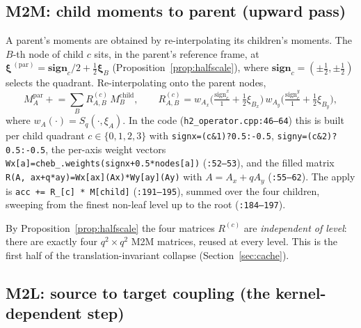 \documentclass[11pt,a4paper]{article}
\newcommand{\code}[1]{\texttt{#1}}
\theoremstyle{definition}
\theoremstyle{remark}
\begin{document}
\subsection{M2M: child moments to parent (upward pass)}
\label{sec:m2m}

A parent's moments are obtained by re-interpolating its children's moments. The
$B$-th node of child $c$ sits, in the parent's reference frame, at
$\boldsymbol\xi^{\,(\text{par})}=\mathbf{sign}_c/2 + \tfrac12\boldsymbol\xi_B$
(Proposition~\ref{prop:halfscale}), where $\mathbf{sign}_c=(\pm\tfrac12,\pm\tfrac12)$
selects the quadrant. Re-interpolating onto the parent nodes,
\begin{equation}
  M^{\text{par}}_A \mathrel{+}= \sum_{B} R^{(c)}_{A,B}\, M^{\text{child}}_B,
  \qquad
  R^{(c)}_{A,B} = w_{A_x}\!\big(\tfrac{\text{sign}^x_c}{1}+\tfrac12\xi_{B_x}\big)\,
                  w_{A_y}\!\big(\tfrac{\text{sign}^y_c}{1}+\tfrac12\xi_{B_y}\big),
  \label{eq:m2m}
\end{equation}
where $w_{A}(\cdot)=S_q(\cdot,\xi_A)$. In the code (\code{h2\_operator.cpp:46--64})
this is built per child quadrant $c\in\{0,1,2,3\}$ with
\code{signx=(c\&1)?0.5:-0.5}, \code{signy=(c\&2)?0.5:-0.5}, the per-axis weight
vectors \code{Wx[a]=cheb\_.weights(signx+0.5*nodes[a])} (\code{:52--53}), and the
filled matrix \code{R(A, ax+q*ay)=Wx[ax](Ax)*Wy[ay](Ay)} with $A=A_x+q A_y$
(\code{:55--62}). The apply is \code{acc += R\_[c] * M[child]}
(\code{:191--195}), summed over the four children, sweeping from the finest
non-leaf level up to the root (\code{:184--197}).

By Proposition~\ref{prop:halfscale} the four matrices $R^{(c)}$ are
\emph{independent of level}: there are exactly four $q^2\times q^2$ M2M matrices,
reused at every level. This is the first half of the translation-invariant
collapse (Section~\ref{sec:cache}).

\subsection{M2L: source to target coupling (the kernel-dependent step)}
\label{sec:m2l}
\end{document}
